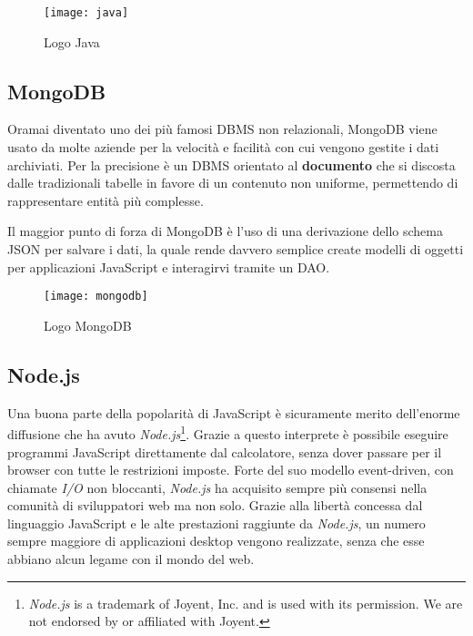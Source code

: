 \begin{figure}[H]
\begin{center}
\texttt{[image: java]}
\caption{Logo Java}
\label{fig:java_logo}
\end{center}
\end{figure}

\subsection{MongoDB}
Oramai diventato uno dei più famosi \gls{DBMS} non relazionali, MongoDB viene
usato da molte aziende per la velocità e facilità con cui vengono gestite i
dati archiviati. Per la precisione è un \gls{DBMS} orientato al
\textbf{documento} che si discosta dalle tradizionali tabelle in favore di un
contenuto non uniforme, permettendo di rappresentare entità più complesse.

Il maggior punto di forza di MongoDB è l'uso di una derivazione dello schema
\gls{JSON} per salvare i dati, la quale rende davvero semplice create modelli di
oggetti per applicazioni JavaScript e interagirvi tramite un \gls{DAO}.

\begin{figure}[H]
\begin{center}
\texttt{[image: mongodb]}
\caption{Logo MongoDB}
\label{fig:mongodb_logo}
\end{center}
\end{figure}

\subsection{Node.js}
Una buona parte della popolarità di JavaScript è sicuramente merito dell'enorme
diffusione che ha avuto \textit{Node.js}\footnote{\textit{Node.js} is a
trademark of Joyent, Inc. and is used with its permission. We are not endorsed
by or affiliated with Joyent.}. Grazie a questo interprete è possibile eseguire
programmi JavaScript direttamente dal calcolatore, senza dover passare per il
browser con tutte le restrizioni imposte. Forte del suo modello
\gls{event-driven}, con chiamate \textit{I/O} non bloccanti, \textit{Node.js}
ha acquisito sempre più consensi nella comunità di sviluppatori web ma non solo.
Grazie alla libertà concessa dal linguaggio JavaScript e le alte prestazioni
raggiunte da \textit{Node.js}, un numero sempre maggiore di applicazioni desktop
vengono realizzate, senza che esse abbiano alcun legame con il mondo del web.

